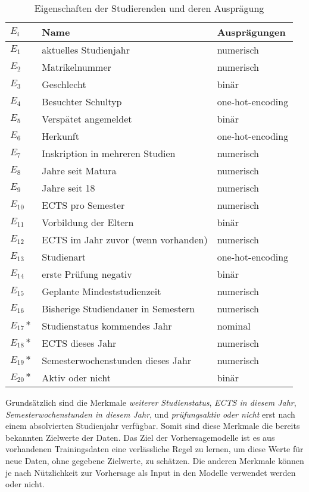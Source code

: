 \begin{table}[ht]
  \caption{\label{tab:name} Eigenschaften der Studierenden und deren Auspr\"agung}
  \begin{tabular}{ p{1cm} p{7cm}  p{5cm} }
    \toprule
    $E_i$ & Name & Ausprägungen \\
    \midrule
    $E_1$ & aktuelles Studienjahr & numerisch \\
    $E_2$ & Matrikelnummer &  numerisch \\
    $E_3$ & Geschlecht & binär \\
    $E_4$ & Besuchter Schultyp & one-hot-encoding  \\
    $E_5$ & Verspätet angemeldet & binär \\
    $E_6$ & Herkunft& one-hot-encoding \\
    $E_7$ & Inskription in mehreren Studien & numerisch \\
    $E_8$ & Jahre seit Matura & numerisch  \\
    $E_9$ & Jahre seit 18 &  numerisch \\
    $E_{10}$ & ECTS pro Semester &  numerisch \\
    $E_{11}$ & Vorbildung der Eltern & binär \\
    $E_{12}$ & ECTS im Jahr zuvor (wenn vorhanden) & numerisch \\
    $E_{13}$ & Studienart & one-hot-encoding \\
    $E_{14}$ & erste Prüfung negativ & binär \\
    $E_{15}$ & Geplante Mindeststudienzeit &  numerisch \\
    $E_{16}$ & Bisherige Studiendauer in Semestern &  numerisch \\
    $E_{17}*$ & Studienstatus kommendes Jahr &  nominal \\
    $E_{18}*$ & ECTS dieses Jahr &  numerisch \\
    $E_{19}*$ & Semesterwochenstunden dieses Jahr &  numerisch \\
    $E_{20}*$ & Aktiv oder nicht &  binär \\
    \bottomrule
    
  \end{tabular}
  
\end{table}

Grunds\"atzlich sind die Merkmale \textit{\glqq weiterer Studienstatus\grqq{}}, 
\textit{\glqq ECTS in diesem Jahr\grqq{}}, \textit{\glqq Semesterwochenstunden in diesem Jahr\grqq{}}, und
\textit{\glqq pr\"ufungsaktiv oder nicht\grqq{}} erst nach einem absolvierten Studienjahr verf\"ugbar. Somit sind diese Merkmale 
die bereits bekannten Zielwerte der Daten. Das Ziel der Vorhersagemodelle ist es aus vorhandenen Trainingsdaten eine verl\"assliche 
Regel zu lernen, um diese Werte f\"ur neue Daten, ohne gegebene Zielwerte, zu 
sch\"atzen. Die anderen Merkmale k\"onnen je nach N\"utzlichkeit zur Vorhersage als Input 
in den Modelle verwendet werden oder nicht. \\

